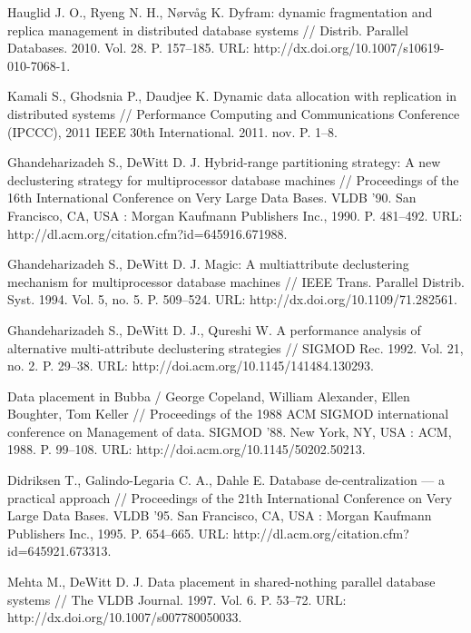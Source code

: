 \documentclass[unicode]{beamer}
\begin{document}
\begin{frame}[allowframebreaks]
{\begin{thebibliography}{99}
 Hauglid J. O., Ryeng N. H., N{\o}rv{\aa}g K. Dyfram: dynamic fragmentation and replica management in distributed database systems // Distrib. Parallel Databases. 2010. Vol. 28. P. 157--185. URL: http://dx.doi.org/10.1007/s10619-010-7068-1.

 Kamali S., Ghodsnia P., Daudjee K. Dynamic data allocation with replication in distributed systems // Performance Computing and Communications Conference (IPCCC), 2011 IEEE 30th International. 2011. nov. P. 1--8.

 Ghandeharizadeh S., DeWitt D. J. Hybrid-range partitioning strategy: A new declustering strategy for multiprocessor database machines // Proceedings of the 16th International Conference on Very Large Data Bases. VLDB ’90. San Francisco, CA, USA : Morgan Kaufmann Publishers Inc., 1990. P. 481--492. URL: http://dl.acm.org/citation.cfm?id=645916.671988.

 Ghandeharizadeh S., DeWitt D. J. Magic: A multiattribute declustering mechanism for multiprocessor database machines // IEEE Trans. Parallel Distrib. Syst. 1994. Vol. 5, no. 5. P. 509--524. URL: http://dx.doi.org/10.1109/71.282561.

 Ghandeharizadeh S., DeWitt D. J., Qureshi W. A performance analysis of alternative multi-attribute declustering strategies // SIGMOD Rec. 1992. Vol. 21, no. 2. P. 29--38. URL: http://doi.acm.org/10.1145/141484.130293.

 Data placement in Bubba / George Copeland, William Alexander, Ellen Boughter, Tom Keller // Proceedings of the 1988 ACM SIGMOD international conference on Management of data. SIGMOD ’88. New York, NY, USA : ACM, 1988. P. 99--108. URL: http://doi.acm.org/10.1145/50202.50213.

 Didriksen T., Galindo-Legaria C. A., Dahle E. Database de-centralization --- a practical approach // Proceedings of the 21th International Conference on Very Large Data Bases. VLDB ’95. San Francisco, CA, USA : Morgan Kaufmann Publishers Inc., 1995. P. 654--665. URL: http://dl.acm.org/citation.cfm?id=645921.673313.

 Mehta M., DeWitt D. J. Data placement in shared-nothing parallel database systems // The VLDB Journal. 1997. Vol. 6. P. 53--72. URL: http://dx.doi.org/10.1007/s007780050033.


\end{thebibliography}}
\end{frame}
\end{document}
